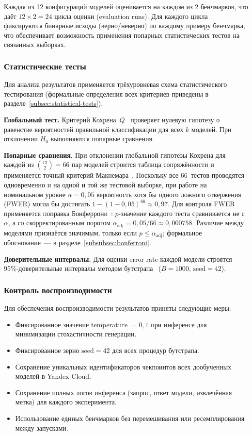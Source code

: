 Каждая из 12 конфигураций моделей оценивается на каждом из 2 бенчмарков, что даёт $12 \times 2 = 24$ цикла оценки (evaluation runs). Для каждого цикла фиксируются бинарные исходы (верно/неверно) по каждому примеру бенчмарка, что обеспечивает возможность применения попарных статистических тестов на связанных выборках.

\subsubsection{Статистические тесты} \label{subsubsec:stat_tests}

Для анализа результатов применяется трёхуровневая схема статистического тестирования (формальные определения всех критериев приведены в разделе~\ref{subsec:statistical-tests}).

\textbf{Глобальный тест.} Критерий Кохрена~$Q$~\cite{cochran1950comparison} проверяет нулевую гипотезу о равенстве вероятностей правильной классификации для всех $k$ моделей. При отклонении $H_0$ выполняются попарные сравнения.

\textbf{Попарные сравнения.} При отклонении глобальной гипотезы Кохрена для каждой из $\binom{12}{2} = 66$ пар моделей строится таблица сопряжённости и применяется точный критерий Макнемара~\cite{mcnemar1947note}. Поскольку все 66~тестов проводятся одновременно и на одной и той же тестовой выборке, при работе на номинальном уровне $\alpha = 0{,}05$ вероятность хотя бы одного ложного отвержения (FWER) могла бы достигать $1 - (1 - 0{,}05)^{66} \approx 0{,}97$. Для контроля FWER применяется поправка Бонферрони~\cite{bonferroni1936teoria, dunn1961multiple}: $p$-значение каждого теста сравнивается не с $\alpha$, а со скорректированным порогом $\alpha_{\mathrm{adj}} = 0{,}05 / 66 \approx 0{,}000758$. Различие между моделями признаётся значимым, только если $p \leqslant \alpha_{\mathrm{adj}}$; формальное обоснование~--- в разделе~\ref{subsubsec:bonferroni}.

\textbf{Доверительные интервалы.} Для оценки error rate каждой модели строятся 95\%-доверительные интервалы методом бутстрапа~\cite{efron1979bootstrap} ($B = 1000$, $\mathrm{seed} = 42$).

\subsubsection{Контроль воспроизводимости}

Для обеспечения воспроизводимости результатов приняты следующие меры:
\begin{itemize}
    \item Фиксированное значение temperature $= 0{,}1$ при инференсе для минимизации стохастичности генерации.
    \item Фиксированное зерно $\mathrm{seed} = 42$ для всех процедур бутстрапа.
    \item Сохранение уникальных идентификаторов чекпоинтов всех дообученных моделей в Yandex Cloud.
    \item Сохранение полных логов инференса (запрос, ответ модели, извлечённая метка) для каждого эксперимента.
    \item Использование единых бенчмарков без перемешивания или ресемплирования между запусками.
\end{itemize}
